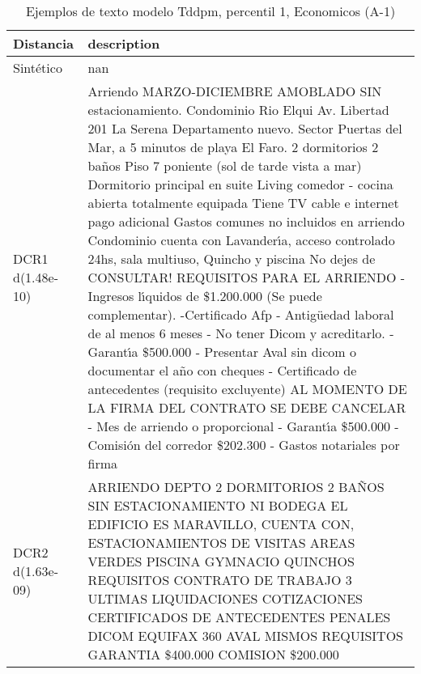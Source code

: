 \begin{table}[H]
\centering
\fontsize{10}{14}\selectfont
\caption{Ejemplos de texto modelo Tddpm, percentil 1, Economicos (A-1)}
\label{table-example-economicos-a-1-tddpm_mlp-1p-text}
\begin{tabular}{|l|m{35em}|}
\hline
\rowcolor[gray]{0.8}
Distancia & description \\
\hline Sintético & nan \\
\hline DCR1 d(1.48e-10) & Arriendo MARZO-DICIEMBRE AMOBLADO SIN estacionamiento. Condominio Rio Elqui Av. Libertad 201 La Serena Departamento nuevo. Sector Puertas del Mar, a 5 minutos de playa El Faro. 2 dormitorios 2 ba\~nos  Piso 7 poniente (sol de tarde vista a mar) Dormitorio principal en suite Living comedor - cocina abierta totalmente equipada  Tiene TV cable e internet pago adicional Gastos comunes no incluidos en arriendo Condominio cuenta con Lavander{\'\i}a, acceso controlado 24hs, sala multiuso, Quincho y piscina No dejes de CONSULTAR!  REQUISITOS PARA EL ARRIENDO - Ingresos l{\'\i}quidos de \$1.200.000 (Se puede complementar). -Certificado Afp - Antig\"uedad laboral de al menos 6 meses - No tener Dicom y acreditarlo. - Garant{\'\i}a \$500.000 - Presentar Aval sin dicom o documentar el a\~no con cheques - Certificado de antecedentes (requisito excluyente) AL MOMENTO DE LA FIRMA DEL CONTRATO SE DEBE CANCELAR - Mes de arriendo o proporcional - Garant{\'\i}a \$500.000 - Comisi\'on del corredor \$202.300 - Gastos notariales por firma \\
\hline DCR2 d(1.63e-09) & ARRIENDO DEPTO   2 DORMITORIOS 2 BA\~NOS SIN ESTACIONAMIENTO NI BODEGA  EL EDIFICIO ES MARAVILLO, CUENTA CON, ESTACIONAMIENTOS DE VISITAS AREAS VERDES  PISCINA GYMNACIO QUINCHOS  REQUISITOS CONTRATO DE TRABAJO  3 ULTIMAS LIQUIDACIONES  COTIZACIONES  CERTIFICADOS DE ANTECEDENTES PENALES DICOM EQUIFAX 360 AVAL MISMOS REQUISITOS  GARANTIA \$400.000 COMISION \$200.000 \\
\hline
\end{tabular}
\end{table}
